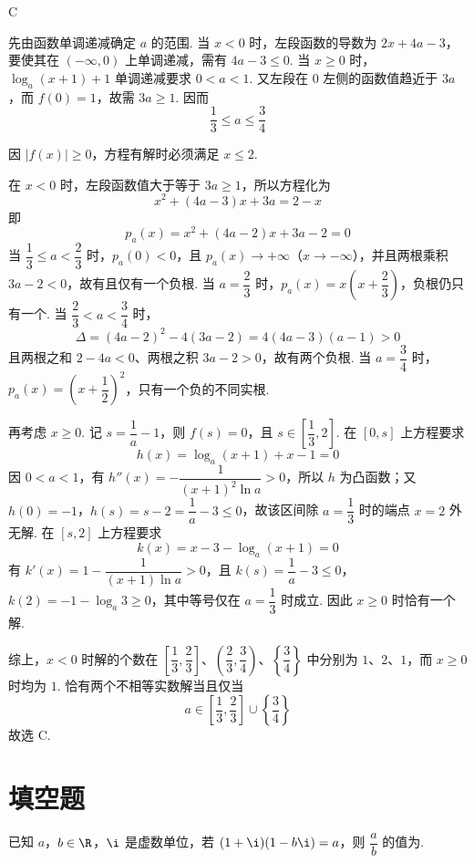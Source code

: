 \begin{answer}
C
\end{answer}

\begin{solution}
先由函数单调递减确定 \(a\) 的范围. 当 \(x<0\) 时，左段函数的导数为 \(2x+4a-3\)，要使其在 \((-\infty,0)\) 上单调递减，需有 \(4a-3\leqslant0\). 当 \(x\geqslant0\) 时，\(\log_a(x+1)+1\) 单调递减要求 \(0<a<1\). 又左段在 \(0\) 左侧的函数值趋近于 \(3a\)，而 \(f(0)=1\)，故需 \(3a\geqslant1\). 因而
\[\frac13\leqslant a\leqslant\frac34\]

因 \(\lvert f(x)\rvert\geqslant0\)，方程有解时必须满足 \(x\leqslant2\).

在 \(x<0\) 时，左段函数值大于等于 \(3a\geqslant1\)，所以方程化为
\[x^2+(4a-3)x+3a=2-x\]
即
\[p_a(x)=x^2+(4a-2)x+3a-2=0\]
当 \(\dfrac13\leqslant a<\dfrac23\) 时，\(p_a(0)<0\)，且 \(p_a(x)\to+\infty\)（\(x\to-\infty\)），并且两根乘积 \(3a-2<0\)，故有且仅有一个负根. 当 \(a=\dfrac23\) 时，\(p_a(x)=x\left(x+\dfrac23\right)\)，负根仍只有一个. 当 \(\dfrac23<a<\dfrac34\) 时，
\[\Delta=(4a-2)^2-4(3a-2)=4(4a-3)(a-1)>0\]
且两根之和 \(2-4a<0\)、两根之积 \(3a-2>0\)，故有两个负根. 当 \(a=\dfrac34\) 时，\(p_a(x)=\left(x+\dfrac12\right)^2\)，只有一个负的不同实根.

再考虑 \(x\geqslant0\). 记 \(s=\dfrac1a-1\)，则 \(f(s)=0\)，且 \(s\in\left[\dfrac13,2\right]\). 在 \([0,s]\) 上方程要求
\[h(x)=\log_a(x+1)+x-1=0\]
因 \(0<a<1\)，有 \(h''(x)=-\dfrac1{(x+1)^2\ln a}>0\)，所以 \(h\) 为凸函数；又 \(h(0)=-1\)，\(h(s)=s-2=\dfrac1a-3\leqslant0\)，故该区间除 \(a=\dfrac13\) 时的端点 \(x=2\) 外无解. 在 \([s,2]\) 上方程要求
\[k(x)=x-3-\log_a(x+1)=0\]
有 \(k'(x)=1-\dfrac1{(x+1)\ln a}>0\)，且 \(k(s)=\dfrac1a-3\leqslant0\)，\(k(2)=-1-\log_a3\geqslant0\)，其中等号仅在 \(a=\dfrac13\) 时成立. 因此 \(x\geqslant0\) 时恰有一个解.

综上，\(x<0\) 时解的个数在 \(\left[\dfrac13,\dfrac23\right]\)、\(\left(\dfrac23,\dfrac34\right)\)、\(\left\{\dfrac34\right\}\) 中分别为 \(1\)、\(2\)、\(1\)，而 \(x\geqslant0\) 时均为 \(1\). 恰有两个不相等实数解当且仅当
\[a\in\left[\dfrac13,\dfrac23\right]\cup\left\{\dfrac34\right\}\]
故选 C.
\end{solution}

\section{填空题}

\begin{problem}
已知 \(a\)，\(b\in\R\)，\(\i\) 是虚数单位，若 \((1+\i)(1-b\i)=a\)，则 \(\dfrac{a}{b}\) 的值为\fillinblank{}.
\end{problem}

